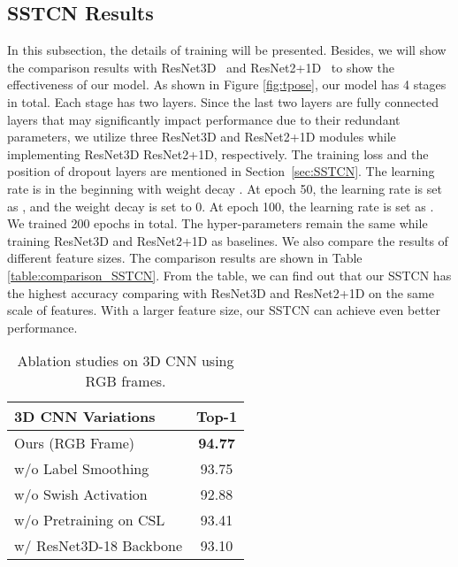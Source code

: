 \documentclass[final]{cvpr}
\begin{document}
\subsection{SSTCN Results}
\label{sec:ablation study SSTCN}
In this subsection, the details of training will be presented. Besides, we will show the comparison results with ResNet3D~\cite{hara2018can,kataoka2020would} and ResNet2+1D~\cite{tran2018closer} to show the effectiveness of our model. As shown in Figure \ref{fig:tpose}, our model has 4 stages in total. Each stage has two layers. Since the last two layers are fully connected layers that may significantly impact performance due to their redundant parameters, we utilize three ResNet3D and ResNet2+1D modules while implementing ResNet3D ResNet2+1D, respectively. The training loss and the position of dropout layers are mentioned in Section~\ref{sec:SSTCN}. The learning rate is  in the beginning with weight decay . At epoch 50, the learning rate is set as , and the weight decay is set to 0. At epoch 100, the learning rate is set as . We trained 200 epochs in total. The hyper-parameters remain the same while training ResNet3D and ResNet2+1D as baselines. We also compare the results of different feature sizes. The comparison results are shown in Table \ref{table:comparison_SSTCN}. From the table, we can find out that our SSTCN has the highest accuracy comparing with ResNet3D and ResNet2+1D on the same scale of features. With a larger feature size, our SSTCN can achieve even better performance. 

\begin{table}
\begin{center}
\begin{tabular}{l | c}
\hline
3D CNN Variations & Top-1 \\
\hline
\hline
Ours (RGB Frame) & \textbf{94.77} \\
\hline
w/o Label Smoothing & 93.75\\
w/o Swish Activation & 92.88\\
w/o Pretraining on CSL & 93.41\\
w/ ResNet3D-18 Backbone & 93.10\\
\hline
\end{tabular}
\end{center}\caption{Ablation studies on 3D CNN using RGB frames.}
\label{tab:ablation_rgb}

\end{table}
\end{document}
